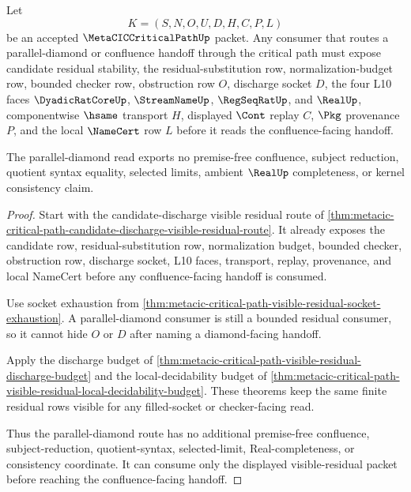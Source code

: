 \begin{theorem}
\label{thm:metacic-critical-path-parallel-diamond-visible-residual-consumer}
Let
$$
K=(S,N,O,U,D,H,C,P,L)
$$
be an accepted $\MetaCICCriticalPathUp$ packet. Any consumer that routes a parallel-diamond or confluence handoff through the critical path must expose candidate residual stability, the residual-substitution row, normalization-budget row, bounded checker row, obstruction row $O$, discharge socket $D$, the four L10 faces $\DyadicRatCoreUp$, $\StreamNameUp$, $\RegSeqRatUp$, and $\RealUp$, componentwise $\hsame$ transport $H$, displayed $\Cont$ replay $C$, $\Pkg$ provenance $P$, and the local $\NameCert$ row $L$ before it reads the confluence-facing handoff.

The parallel-diamond read exports no premise-free confluence, subject reduction, quotient syntax equality, selected limits, ambient $\RealUp$ completeness, or kernel consistency claim.
\end{theorem}
\begin{proof}
Start with the candidate-discharge visible residual route of \autoref{thm:metacic-critical-path-candidate-discharge-visible-residual-route}. It already exposes the candidate row, residual-substitution row, normalization budget, bounded checker, obstruction row, discharge socket, L10 faces, transport, replay, provenance, and local NameCert before any confluence-facing handoff is consumed.

Use socket exhaustion from \autoref{thm:metacic-critical-path-visible-residual-socket-exhaustion}. A parallel-diamond consumer is still a bounded residual consumer, so it cannot hide $O$ or $D$ after naming a diamond-facing handoff.

Apply the discharge budget of \autoref{thm:metacic-critical-path-visible-residual-discharge-budget} and the local-decidability budget of \autoref{thm:metacic-critical-path-visible-residual-local-decidability-budget}. These theorems keep the same finite residual rows visible for any filled-socket or checker-facing read.

Thus the parallel-diamond route has no additional premise-free confluence, subject-reduction, quotient-syntax, selected-limit, Real-completeness, or consistency coordinate. It can consume only the displayed visible-residual packet before reaching the confluence-facing handoff.
\end{proof}
